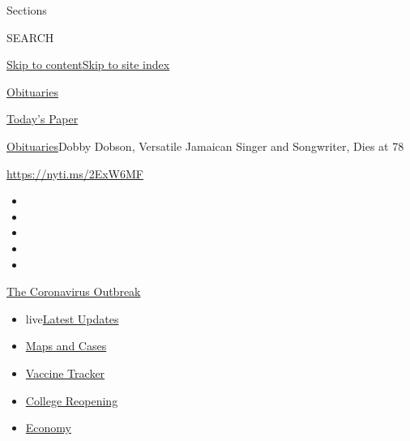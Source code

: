 Sections

SEARCH

\protect\hyperlink{site-content}{Skip to
content}\protect\hyperlink{site-index}{Skip to site index}

\href{https://www.nytimes.com/section/obituaries}{Obituaries}

\href{https://myaccount.nytimes.com/auth/login?response_type=cookie\&client_id=vi}{}

\href{https://www.nytimes.com/section/todayspaper}{Today's Paper}

\href{/section/obituaries}{Obituaries}\textbar{}Dobby Dobson, Versatile
Jamaican Singer and Songwriter, Dies at 78

\url{https://nyti.ms/2ExW6MF}

\begin{itemize}
\item
\item
\item
\item
\item
\end{itemize}

\href{https://www.nytimes.com/news-event/coronavirus?action=click\&pgtype=Article\&state=default\&region=TOP_BANNER\&context=storylines_menu}{The
Coronavirus Outbreak}

\begin{itemize}
\tightlist
\item
  live\href{https://www.nytimes.com/2020/08/03/world/coronavirus-covid-19.html?action=click\&pgtype=Article\&state=default\&region=TOP_BANNER\&context=storylines_menu}{Latest
  Updates}
\item
  \href{https://www.nytimes.com/interactive/2020/us/coronavirus-us-cases.html?action=click\&pgtype=Article\&state=default\&region=TOP_BANNER\&context=storylines_menu}{Maps
  and Cases}
\item
  \href{https://www.nytimes.com/interactive/2020/science/coronavirus-vaccine-tracker.html?action=click\&pgtype=Article\&state=default\&region=TOP_BANNER\&context=storylines_menu}{Vaccine
  Tracker}
\item
  \href{https://www.nytimes.com/2020/08/02/us/covid-college-reopening.html?action=click\&pgtype=Article\&state=default\&region=TOP_BANNER\&context=storylines_menu}{College
  Reopening}
\item
  \href{https://www.nytimes.com/live/2020/08/03/business/stock-market-today-coronavirus?action=click\&pgtype=Article\&state=default\&region=TOP_BANNER\&context=storylines_menu}{Economy}
\end{itemize}

